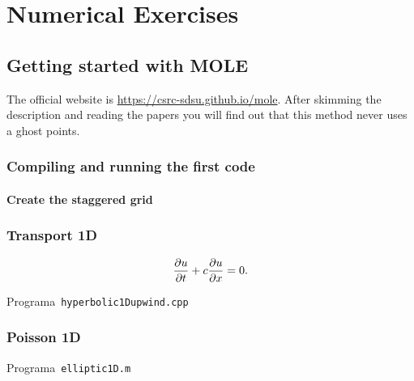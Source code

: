 \part{Numerical Exercises}

\chapter{Getting started with MOLE}

The official website is \url{https://csrc-sdsu.github.io/mole}.
After skimming the description and reading the papers you will find out that this method never uses a ghost points.

\section{Compiling and running the first code}

\subsection{Create the staggered grid}

\section{Transport 1D}

\begin{equation*}
    \diffp{u}{t}+c\diffp{u}{x}=
    0.
\end{equation*}

\begin{listing}[ht!]
    \tiny
    \centering
    \caption{Programa~\texttt{hyperbolic1Dupwind.cpp}}
    \label{code:hyperbolic1Dupwind.cpp}
\end{listing}

\section{Poisson 1D}

\begin{listing}[ht!]
    \tiny
    \centering
    \caption{Programa~\texttt{elliptic1D.m}}
    \label{code:elliptic1D.m}
\end{listing}

